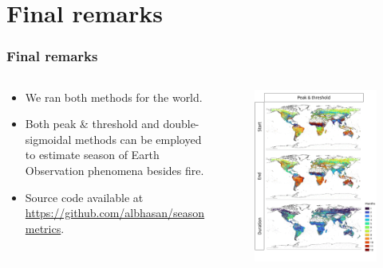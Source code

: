 \documentclass[aspectratio=169]{beamer}
\begin{document}
\section{Final remarks}

\begin{frame}
    \frametitle{Final remarks}
    \begin{columns}
        \begin{column}{0.5\linewidth}
            \begin{itemize}
                \item We ran both methods for the world.
                \item Both peak \& threshold and double-sigmoidal methods can
                    be employed to estimate season of Earth Observation
                    phenomena besides fire.
                \item Source code available at
                    \url{https://github.com/albhasan/seasonmetrics}.
            \end{itemize}
        \end{column}
        \begin{column}{0.5\linewidth}
            \begin{figure}[h]
                \includegraphics[width=0.75\linewidth]
                {./images/pthres_world.png}
            \end{figure}
        \end{column}
    \end{columns}
\end{frame}
\end{document}
